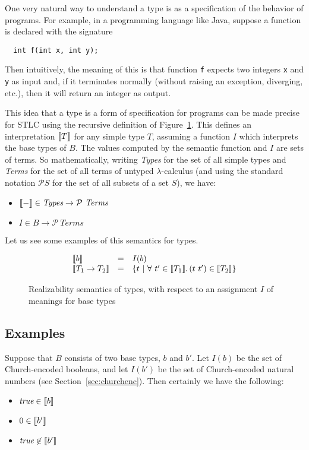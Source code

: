 One very natural way to understand a type is as a specification
of the behavior of programs.  For example, in a programming
language like Java, suppose a function is declared with the signature

\begin{verbatim}
  int f(int x, int y);
\end{verbatim}

\noindent Then intuitively, the meaning of this is that function
\verb|f| expects two integers \verb|x| and \verb|y| as input and, if
it terminates normally (without raising an exception, diverging,
etc.), then it will return an integer as output.

This idea that a type is a form of specification for programs can be
made precise for STLC using the recursive definition of
Figure~\ref{fig:stlcrealize}.  This defines an interpretation $\llbracket T \rrbracket$ for
any simple type $T$, assuming a function $I$ which interprets the base types of $B$.
The values computed by the semantic function and $I$ are sets of terms.  So mathematically,
writing \textit{Types} for the set of all simple types and \textit{Terms} for the set
of all terms of untyped $\lambda$-calculus (and using the standard notation $\mathcal{P} S$ for
the set of all subsets of a set $S$), we have:
\begin{itemize}
\item $\llbracket - \rrbracket \in \textit{Types} \to \mathcal{P}\ \textit{Terms}$
\item $I \in B \to \mathcal{P}\ \textit{Terms}$
\end{itemize}

Let us see some examples of this semantics for types.

\begin{figure}
\[
\begin{array}{lll}
\interp{b} & = & I(b) \\
\interp{T_1\to T_2} & = & \{ t\ |\ \all{t' \in \interp{T_1}}{(t\ t') \in\interp{T_2}} \}
\end{array}
\]
\caption{Realizability semantics of types, with respect to an assignment $I$ of meanings for base types}
\label{fig:stlcrealize}
\end{figure}

\subsection{Examples}

Suppose that $B$ consists of two base types, $b$ and $b'$.  Let $I(b)$ be the set of Church-encoded booleans,
and let $I(b')$ be the set of Church-encoded natural numbers (see Section~\ref{sec:churchenc}).  Then
certainly we have the following:
\begin{itemize}
\item $\textit{true}\in\llbracket b \rrbracket$
\item $0\in\llbracket b' \rrbracket$
\item $\textit{true}\not\in\llbracket b' \rrbracket$
\end{itemize}

